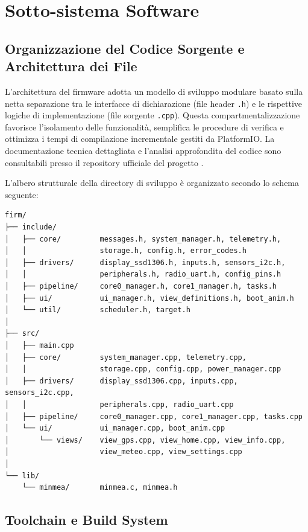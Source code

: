 \newpage
\section{Sotto-sistema Software}

\subsection{Organizzazione del Codice Sorgente e Architettura dei File}

L'architettura del firmware adotta un modello di sviluppo modulare basato sulla netta separazione tra le interfacce di dichiarazione (file header \texttt{.h}) e le rispettive logiche di implementazione (file sorgente \texttt{.cpp}). Questa compartmentalizzazione favorisce l'isolamento delle funzionalità, semplifica le procedure di verifica e ottimizza i tempi di compilazione incrementale gestiti da PlatformIO. La documentazione tecnica dettagliata e l'analisi approfondita del codice sono consultabili presso il repository ufficiale del progetto \cite{ppse_homepage}.

L'albero strutturale della directory di sviluppo è organizzato secondo lo schema seguente:

\begin{verbatim}
firm/
├── include/
│   ├── core/         messages.h, system_manager.h, telemetry.h,
│   │                 storage.h, config.h, error_codes.h
│   ├── drivers/      display_ssd1306.h, inputs.h, sensors_i2c.h,
│   │                 peripherals.h, radio_uart.h, config_pins.h
│   ├── pipeline/     core0_manager.h, core1_manager.h, tasks.h
│   ├── ui/           ui_manager.h, view_definitions.h, boot_anim.h
│   └── util/         scheduler.h, target.h
│
├── src/
│   ├── main.cpp
│   ├── core/         system_manager.cpp, telemetry.cpp,
│   │                 storage.cpp, config.cpp, power_manager.cpp
│   ├── drivers/      display_ssd1306.cpp, inputs.cpp, sensors_i2c.cpp,
│   │                 peripherals.cpp, radio_uart.cpp
│   ├── pipeline/     core0_manager.cpp, core1_manager.cpp, tasks.cpp
│   └── ui/           ui_manager.cpp, boot_anim.cpp
│       └── views/    view_gps.cpp, view_home.cpp, view_info.cpp,
│                     view_meteo.cpp, view_settings.cpp
│
└── lib/
    └── minmea/       minmea.c, minmea.h
\end{verbatim}

\subsection{Toolchain e Build System}

